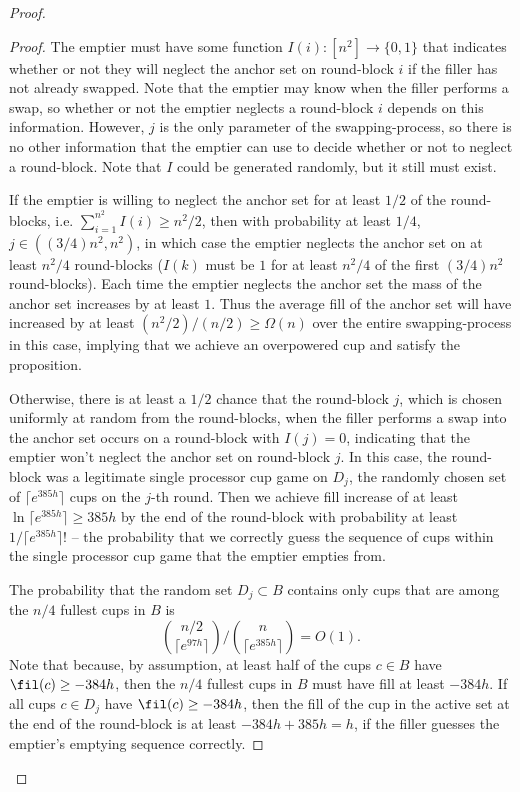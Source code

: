 \begin{proof}
\begin{proof}
  The emptier must have some function $I(i): [n^2] \to \{0,1\}$ that indicates whether or
  not they will neglect the anchor set on round-block $i$ if the filler has not
  already swapped. Note that the emptier may know when the filler performs a
  swap, so whether or not the emptier neglects a round-block $i$ depends on
  this information. However, $j$ is the only parameter of the swapping-process,
  so there is no other information that the emptier can use to decide whether
  or not to neglect a round-block. Note that $I$ could be generated randomly,
  but it still must exist. 

  If the emptier is willing to neglect the anchor set for at least $1/2$ of the
  round-blocks, i.e. $\sum_{i=1}^{n^2} I(i) \ge n^2 / 2$, then with probability
  at least $1/4$, $j \in ((3/4) n^2, n^2)$, in which case the emptier neglects
  the anchor set on at least $n^2/4$ round-blocks ($I(k)$ must be $1$ for at
  least $n^2/4$ of the first $(3/4)n^2$ round-blocks). Each time the emptier
  neglects the anchor set the mass of the anchor set increases by at least $1$.
  Thus the average fill of the anchor set will have increased by at least
  $(n^2/2)/(n/2) \ge \Omega(n)$ over the entire swapping-process in this
  case, implying that we achieve an overpowered cup and satisfy the proposition. 

  Otherwise, there is at least a $1/2$ chance that the round-block $j$, which
  is chosen uniformly at random from the round-blocks, when the filler performs
  a swap into the anchor set occurs on a round-block with $I(j)=0$, indicating
  that the emptier won't neglect the anchor set on round-block $j$. In this
  case, the round-block was a legitimate single processor cup game on $D_j$,
  the randomly chosen set of $\lceil e^{385h} \rceil$ cups on the $j$-th round.
  Then we achieve fill increase of at least $\ln \lceil e^{385h} \rceil \ge 385h$
  by the end of the round-block with probability at least $1/\lceil
  e^{385h}\rceil!$ -- the probability that we correctly guess the sequence of
  cups within the single processor cup game that the emptier empties from. 

  The probability that the random set $D_j \subset B$ contains only cups that
  are among the $n/4$ fullest cups in $B$ is $${n/2 \choose {\lceil e^{97h}
  \rceil}} / {n \choose {\lceil e^{385h}\rceil}} = O(1).$$ Note that because, by
  assumption, at least half of the cups $c \in B$ have $\fil(c) \ge -384h$, then
  the $n/4$ fullest cups in $B$ must have fill at least $-384h$. If all cups $
  c\in D_j$ have $\fil(c) \ge -384h$, then the fill of the cup in the active set
  at the end of the round-block is at least $-384h + 385h = h$, if the filler
  guesses the emptier's emptying sequence correctly.


\end{proof}
\end{proof}
